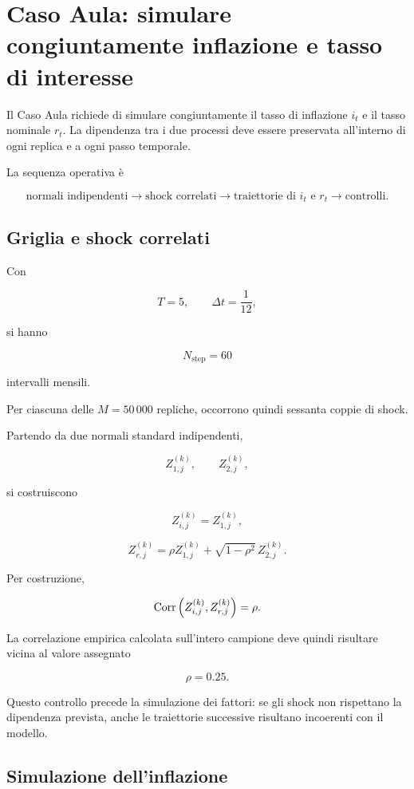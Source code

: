 \section{Caso Aula: simulare congiuntamente inflazione e tasso di interesse}

Il Caso Aula richiede di simulare congiuntamente il tasso di inflazione
\(i_t\) e il tasso nominale \(r_t\). La dipendenza tra i due processi deve
essere preservata all'interno di ogni replica e a ogni passo temporale.

La sequenza operativa \`e

\[
\text{normali indipendenti}
\longrightarrow
\text{shock correlati}
\longrightarrow
\text{traiettorie di } i_t \text{ e } r_t
\longrightarrow
\text{controlli}.
\]

\subsection{Griglia e shock correlati}

Con

\[
T=5,
\qquad
\Delta t=\frac{1}{12},
\]

\noindent si hanno

\[
N_{\mathrm{step}}=60
\]

\noindent intervalli mensili.

Per ciascuna delle \(M=50\,000\) repliche, occorrono quindi sessanta coppie di
shock.

Partendo da due normali standard indipendenti,

\[
Z_{1,j}^{(k)},
\qquad
Z_{2,j}^{(k)},
\]

\noindent si costruiscono

\[
Z_{i,j}^{(k)}
=
Z_{1,j}^{(k)},
\]

\[
Z_{r,j}^{(k)}
=
\rho Z_{1,j}^{(k)}
+
\sqrt{1-\rho^2}\,Z_{2,j}^{(k)}.
\]

Per costruzione,

\[
\operatorname{Corr}
\left(
Z_{i,j}^{(k)},
Z_{r,j}^{(k)}
\right)
=
\rho.
\]

La correlazione empirica calcolata sull'intero campione deve quindi risultare
vicina al valore assegnato

\[
\rho=0.25.
\]

Questo controllo precede la simulazione dei fattori: se gli shock non
rispettano la dipendenza prevista, anche le traiettorie successive risultano
incoerenti con il modello.

\subsection{Simulazione dell'inflazione}

